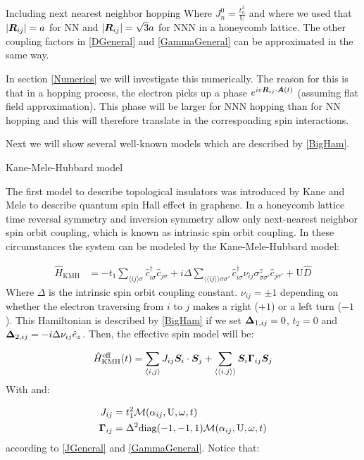 \begin{section}{Including next nearest neighbor hopping}
Where $J_n^0 = \frac{t_n^2}{\text{U}}$ and where we used that $|\boldsymbol{R}_{ij}| = a$ for NN and $|\boldsymbol{R}_{ij}| = \sqrt{3}a$ for NNN in a honeycomb lattice. The other coupling factors in \ref{DGeneral} and \ref{GammaGeneral} can be approximated in the same way.

In section \ref{Numerics} we will investigate this numerically. The reason for this is that in a hopping process, the electron picks up a phase $e^{ie\boldsymbol{R}_{ij}\cdot\boldsymbol{A}(t)}$ (assuming flat field approximation). This phase will be larger for NNN hopping than for NN hopping and this will therefore translate in the corresponding spin interactions.

Next we will show several well-known models which are described by \ref{BigHam}.

\begin{subsection}{Kane-Mele-Hubbard model}

The first model to describe topological insulators was introduced by Kane and Mele \cite{Kane2005} to describe quantum spin Hall effect in graphene. In a honeycomb lattice time reversal symmetry and inversion symmetry allow only next-nearest neighbor spin orbit coupling, which is known as intrinsic spin orbit coupling. In these circumstances the system can be modeled by the Kane-Mele-Hubbard model:

\begin{align}
\label{KMH}
\hat{H}_{\text{KMH}} &= -t_1\sum_{\langle i j \rangle \sigma} \hat{c}^{\dagger}_{i\sigma}\hat{c}_{j\sigma} + i\Delta \sum_{\langle \langle i j \rangle \rangle \sigma \sigma'} \hat{c}^{\dagger}_{i\sigma} \nu_{ij} \sigma^z_{\sigma \sigma'} \hat{c}_{j\sigma'} + \text{U}\hat{D}
\end{align}
Where $\Delta$ is the intrinsic spin orbit coupling constant. $\nu_{ij}=\pm 1$ depending on whether the electron traversing from $i$ to $j$ makes a right ($+1$) or a left turn ($-1$). This Hamiltonian is described by \ref{BigHam} if we set $\boldsymbol{\Delta}_{1,ij} = 0$, $t_2 = 0$ and $\boldsymbol{\Delta}_{2,ij} = -i\Delta \nu_{ij} \hat{e}_z$. Then, the effective spin model will be:

\begin{equation}
\label{KMHeff}
\hat{H}_{\text{KMH}}^{\text{eff}}(t) = \sum_{\langle i,j \rangle} J_{ij} \boldsymbol{S}_i \cdot\boldsymbol{S}_j + \sum_{\langle \langle i,j \rangle \rangle} \boldsymbol{S}_i \boldsymbol{\Gamma}_{ij} \boldsymbol{S}_j 
\end{equation}
With and:

\begin{align*}
J_{ij} &= t_1^2\mathcal{M}(\alpha_{ij}, \text{U}, \omega, t) \\
\boldsymbol{\Gamma}_{ij} &= \Delta^2 \text{diag}(-1,-1,1)\mathcal{M}(\alpha_{ij}, \text{U}, \omega, t)
\end{align*}
according to \ref{JGeneral} and \ref{GammaGeneral}. Notice that:


\end{subsection}
\end{section}
